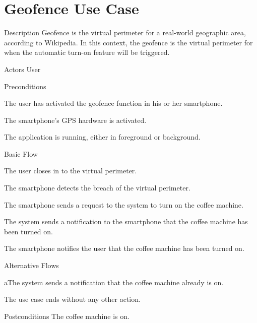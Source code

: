 \section{Geofence Use Case}

\begin{cpart}{Description}
Geofence is the virtual perimeter for a real-world geographic area, according to Wikipedia. In this context, the geofence is the virtual perimeter for when the automatic turn-on feature will be triggered.
\end{cpart}

\begin{cpart}{Actors}
User
\end{cpart}

\begin{cpartList}{Preconditions}
\item The user has activated the geofence function in his or her smartphone.
\item The smartphone's GPS hardware is activated.
\item The application is running, either in foreground or background.
\end{cpartList}

\begin{cpartList}{Basic Flow}
\item The user closes in to the virtual perimeter.
\item The smartphone detects the breach of the virtual perimeter.
\item The smartphone sends a request to the system to turn on the coffee machine.
\item The system sends a notification to the smartphone that the coffee machine has been turned on.
\item The smartphone notifies the user that the coffee machine has been turned on.
\end{cpartList}

\begin{cpartList}{Alternative Flows}
\begin{innerList}{4}{a}{The system sends a notification that the coffee machine already is on.}
\item The use case ends without any other action.
\end{innerList}
\end{cpartList}

\begin{cpart}{Postconditions}
The coffee machine is on.
\end{cpart}
